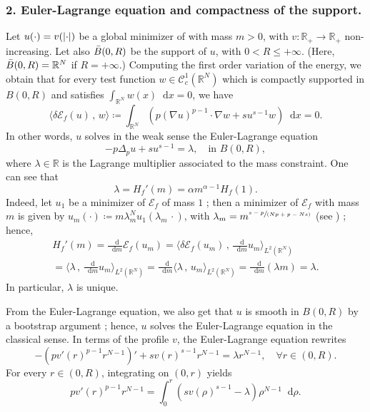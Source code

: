 \documentclass[10pt]{amsart}
\newcommand{\spfrac}[2]{{\sfrac{#1}{(#2)}}}
\theoremstyle{plain}
\theoremstyle{definition}
\newcommand{\dd}{\mathop{}\mathopen{}\mathrm{d}}
\newcommand{\R}{\mathbb{R}}
\newcommand{\ener}{\mathcal{E}}
\DeclarePairedDelimiter{\abs}{\lvert}{\rvert}
\begin{document}
\subsubsection*{\textup{2}. Euler-Lagrange equation and compactness of the support.} Let $u(\cdot)=v(\abs{\cdot})$ be a global minimizer of  with mass $m>0$, with $v:\R_+\to\R_+$ non-increasing. Let also $\Bar B(0,R)$ be the support of $u$, with $0<R\leq +\infty$. (Here, $\Bar B(0,R)=\R^N$ if $R=+\infty$.) Computing the first order variation of the energy, we obtain that for every test function $w\in\mathcal{C}_c^1(\R^N)$ which is compactly supported in $B(0,R)$ and satisfies $\int_{\R^N}w(x)\dd x=0$, we have\vspace*{-3pt}
\begin{equation}
\label{firstOrderConditionU}
\langle \delta \ener_f(u)\,,\, w \rangle \coloneqq \int_{\R^N} (p(\nabla u)^{p-1}\cdot\nabla w+ su^{s-1}w)\dd x= 0.
\end{equation}
In other words, $u$ solves in the weak sense the Euler-Lagrange equation\vspace*{-3pt}
\[
-p\Delta_p u+su^{s-1}=\lambda, \quad\text{in }B(0,R),
\]
where $\lambda\in\R$ is the Lagrange multiplier associated to the mass constraint. One can see that\vspace*{-3pt}
\[\lambda=H_f'(m)=\alpha m^{\alpha-1}H_f(1).\]
Indeed, let $u_1$ be a minimizer of $\ener_f$ of mass $1$ ; then a minimizer of $\ener_f$ with mass $m$ is given by $u_m(\cdot)\coloneqq m\lambda_m^N u_1(\lambda_m\,\cdot)$, with $\lambda_m=m^\spfrac{s-p}{Np+p-Ns}$ (see ) ; hence,\vspace*{-3pt}
\begin{multline}
H_f'(m)=\frac{\dd}{\dd m}\ener_f(u_m
)=\langle\delta\ener_f(u_m)\,,\, \frac{\dd}{\dd m}u_m \rangle_{L^2(\R^N)}\\[-3pt]
=\langle\lambda\,,\, \frac{\dd}{\dd m}u_m \rangle_{L^2(\R^N)}=\frac{\dd}{\dd m}\langle\lambda\,,\, u_m \rangle_{L^2(\R^N)}=\frac{\dd}{\dd m}(\lambda m) =\lambda.
\end{multline}
In particular, $\lambda$ is unique.

From the Euler-Lagrange equation, we also get that $u$ is smooth in $B(0,R)$ by a bootstrap argument ; hence, $u$ solves the Euler-Lagrange equation in the classical sense. In terms of the profile $v$, the Euler-Lagrange equation rewrites
\begin{equation}
\label{EulerLagrange}
-(pv'(r)^{p-1}r^{N-1})'+sv(r)^{s-1}r^{N-1}=\lambda r^{N-1},\quad\forall r\in(0,R).
\end{equation}
For every $r\in (0,R)$, integrating  on $(0,r)$ yields\vspace*{-3pt}
\begin{equation}
\label{integrationODE}
pv'(r)^{p-1}r^{N-1}=\int_0^r(sv(\rho)^{s-1}-\lambda)\rho^{N-1}\dd \rho.
\end{equation}
\end{document}
